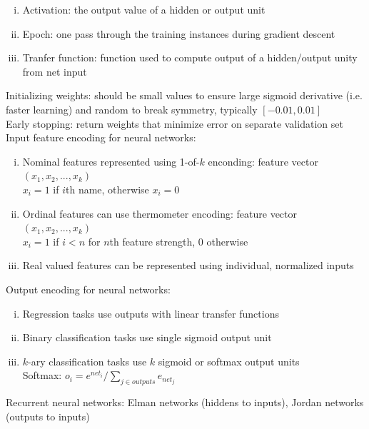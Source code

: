 \documentclass{article}
\begin{document}
			\begin{enumerate}[(i)]
				\item Activation: the output value of a hidden or output unit
				\item Epoch: one pass through the training instances during gradient descent
				\item Tranfer function: function used to compute output of a hidden/output unity from net input
				\end{enumerate}
			Initializing weights: should be small values to ensure large sigmoid derivative (i.e. faster learning) and random to break symmetry, typically $[-0.01, 0.01]$ \\
			Early stopping: return weights that minimize error on separate validation set \\
			Input feature encoding for neural networks:
			\begin{enumerate}[(i)]
				\item Nominal features represented using 1-of-$k$ enconding: feature vector $(x_1, x_2, ..., x_k)$ \\
				$x_i = 1$ if $i$th name, otherwise $x_i = 0$
				\item Ordinal features can use thermometer encoding: feature vector $(x_1, x_2, ..., x_k)$ \\
				$x_i = 1$ if $i < n$ for $n$th feature strength, $0$ otherwise
				\item Real valued features can be represented using individual, normalized inputs
				\end{enumerate}
			Output encoding for neural networks:
			\begin{enumerate}[(i)]
				\item Regression tasks use outputs with linear transfer functions
				\item Binary classification tasks use single sigmoid output unit
				\item $k$-ary classification tasks use $k$ sigmoid or softmax output units \\
				Softmax: $o_i = e^{net_i}/\sum_{j \in outputs} e_{net_j}$
				\end{enumerate}
			Recurrent neural networks: Elman networks (hiddens to inputs), Jordan networks (outputs to inputs)
\end{document}
